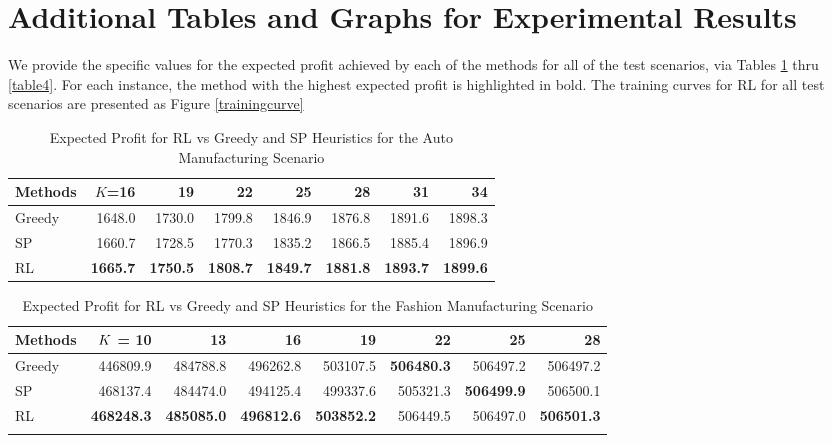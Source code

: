 \documentclass{article} %
\begin{document}
\section{Additional Tables and Graphs for Experimental Results}\label{sec:add_table}
We provide the specific values for the expected profit achieved by each of the methods for all of the test scenarios, via Tables \ref{table1} thru \ref{table4}. For each instance, the method with the highest expected profit is highlighted in bold. The training curves for RL for all test scenarios are presented as Figure \ref{trainingcurve}

\begin{table}[htp]
\begin{center}
\caption{Expected Profit for RL vs Greedy and SP Heuristics for the Auto Manufacturing Scenario}
\begin{tabular}{lrrrrrrr}
\toprule[1.2pt]
\textbf{Methods}                   & $K$\textbf{=16}    & \textbf{19}      & \textbf{22}      & \textbf{25}      & \textbf{28}      & \textbf{31}      & \textbf{34}       \\ \hline
Greedy & 1648.0 & 1730.0 & 1799.8 & 1846.9 & 1876.8 & 1891.6 & 1898.3 \\
SP & 1660.7 & 1728.5 & 1770.3 & 1835.2 & 1866.5 & 1885.4 & 1896.9 \\
RL & \textbf{1665.7} & \textbf{1750.5} & \textbf{1808.7} & \textbf{1849.7} & \textbf{1881.8} & \textbf{1893.7} & \textbf{1899.6} \\\hline
\bottomrule[1.2pt]
\end{tabular}
\label{table1}
\end{center}
\end{table}


\begin{table}[htp]
\begin{center}
\caption{Expected Profit for RL vs Greedy and SP Heuristics for the Fashion Manufacturing Scenario \label{table2}}
\begin{tabular}{lrrrrrrr}
\toprule[1.2pt]
\textbf{Methods} 
& $K$ \textbf{= 10} & \textbf{13} & \textbf{16} & \textbf{19} & \textbf{22} & \textbf{25} & \textbf{28} \\ \hline
Greedy & 446809.9 & 484788.8 & 496262.8 & 503107.5 & \textbf{506480.3} & 506497.2 & 506497.2 \\
SP & 468137.4 & 484474.0 & 494125.4 & 499337.6 & 505321.3 & \textbf{506499.9} & 506500.1 \\
RL & \textbf{468248.3} & \textbf{485085.0} & \textbf{496812.6} & \textbf{503852.2} & 506449.5 & 506497.0 & \textbf{506501.3} \\ \hline
\\
\bottomrule[1.2pt]
\end{tabular}
\end{center}
\end{table}
\end{document}
